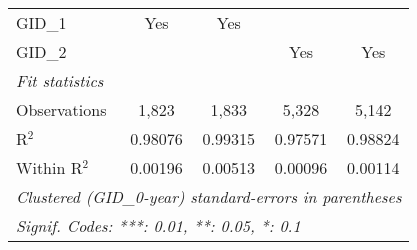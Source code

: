 \begin{tabular}{lcccc}
   GID\_1                                                 & Yes      & Yes                     &                & \\  
   GID\_2                                                 &          &                         & Yes            & Yes\\  
   \midrule
   \emph{Fit statistics}\\
   Observations                                           & 1,823    & 1,833                   & 5,328          & 5,142\\  
   R$^2$                                                  & 0.98076  & 0.99315                 & 0.97571        & 0.98824\\  
   Within R$^2$                                           & 0.00196  & 0.00513                 & 0.00096        & 0.00114\\  
   \midrule \midrule
   \multicolumn{5}{l}{\emph{Clustered (GID\_0-year) standard-errors in parentheses}}\\
   \multicolumn{5}{l}{\emph{Signif. Codes: ***: 0.01, **: 0.05, *: 0.1}}\\
\end{tabular}
\par\endgroup



